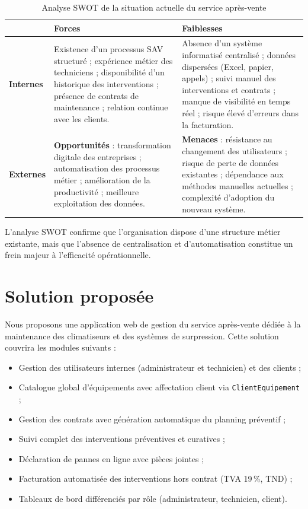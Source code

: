 \begin{table}[H]
\centering
\caption{Analyse SWOT de la situation actuelle du service après-vente}
\label{tab:ch1:swot}
\begin{tabular}{|p{1.8cm}|p{6.5cm}|p{6.5cm}|}
\hline
 & \textbf{Forces} & \textbf{Faiblesses} \\
\hline
\textbf{Internes}
  & Existence d'un processus SAV structuré ; expérience métier des techniciens ;
    disponibilité d'un historique des interventions ; présence de contrats de maintenance ;
    relation continue avec les clients.
  & Absence d'un système informatisé centralisé ; données dispersées (Excel, papier, appels) ;
    suivi manuel des interventions et contrats ; manque de visibilité en temps réel ;
    risque élevé d'erreurs dans la facturation. \\
\hline
\textbf{Externes}
  & \textbf{Opportunités} : transformation digitale des entreprises ; automatisation des processus
    métier ; amélioration de la productivité ; meilleure exploitation des données.
  & \textbf{Menaces} : résistance au changement des utilisateurs ; risque de perte de données
    existantes ; dépendance aux méthodes manuelles actuelles ; complexité d'adoption du nouveau
    système. \\
\hline
\end{tabular}
\end{table}

L'analyse SWOT confirme que l'organisation dispose d'une structure métier existante, mais que
l'absence de centralisation et d'automatisation constitue un frein majeur à l'efficacité opérationnelle.

\section{Solution proposée}

Nous proposons une application web de gestion du service après-vente dédiée à la maintenance des
climatiseurs et des systèmes de surpression. Cette solution couvrira les modules suivants :

\begin{itemize}
    \item Gestion des utilisateurs internes (administrateur et technicien) et des clients ;
    \item Catalogue global d'équipements avec affectation client via \texttt{ClientEquipement} ;
    \item Gestion des contrats avec génération automatique du planning préventif ;
    \item Suivi complet des interventions préventives et curatives ;
    \item Déclaration de pannes en ligne avec pièces jointes ;
    \item Facturation automatisée des interventions hors contrat (TVA 19\,\%, TND) ;
    \item Tableaux de bord différenciés par rôle (administrateur, technicien, client).
\end{itemize}

